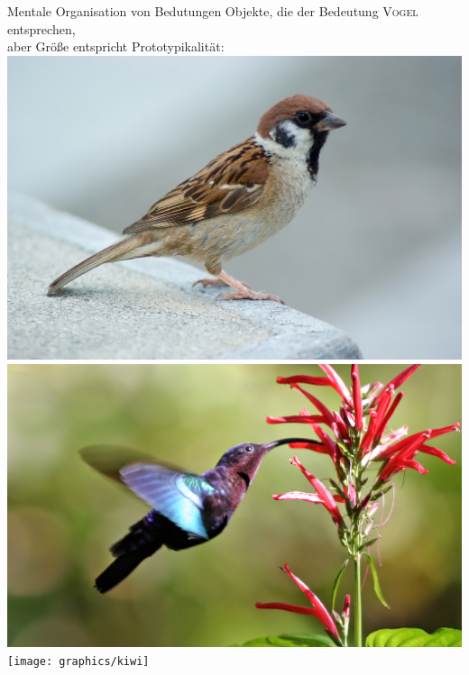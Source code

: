 \begin{frame}
  {Mentale Organisation von Bedutungen}
  Objekte, die der Bedeutung \alert{\textsc{Vogel}} entsprechen,\\
  \Viertelzeile
  aber Größe entspricht \alert{Prototypikalität}:\\
  \Zeile
  \centering 
  \includegraphics[height=0.5\textheight]{graphics/spatz}
  \includegraphics[height=0.25\textheight]{graphics/kolibri}
  \texttt{[image: graphics/kiwi]}
\end{frame}

